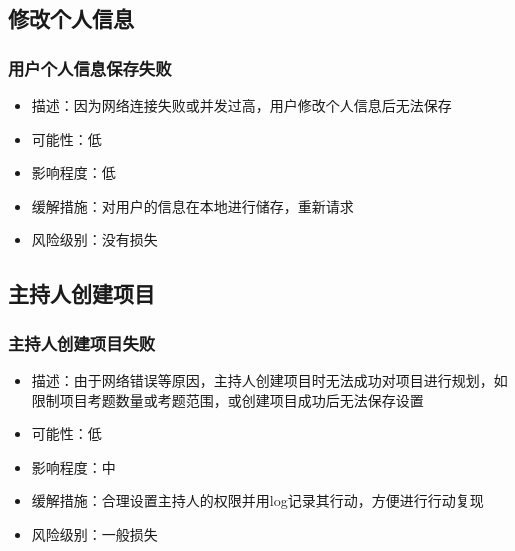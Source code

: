\documentclass[hyperref, a4paper]{ctexart}
\providecommand{\tightlist}{%
  \setlength{\itemsep}{0pt}\setlength{\parskip}{0pt}}
\begin{document}
\hypertarget{ux4feeux6539ux4e2aux4ebaux4fe1ux606f}{%
\subsection{修改个人信息}\label{ux4feeux6539ux4e2aux4ebaux4fe1ux606f}}

\hypertarget{ux7528ux6237ux4e2aux4ebaux4fe1ux606fux4fddux5b58ux5931ux8d25}{%
\subsubsection{用户个人信息保存失败}\label{ux7528ux6237ux4e2aux4ebaux4fe1ux606fux4fddux5b58ux5931ux8d25}}

\begin{itemize}
\tightlist
\item
  描述：因为网络连接失败或并发过高，用户修改个人信息后无法保存
\item
  可能性：低
\item
  影响程度：低
\item
  缓解措施：对用户的信息在本地进行储存，重新请求
\item
  风险级别：没有损失
\end{itemize}

\hypertarget{ux4e3bux6301ux4ebaux521bux5efaux9879ux76ee-1}{%
\subsection{主持人创建项目}\label{ux4e3bux6301ux4ebaux521bux5efaux9879ux76ee-1}}

\hypertarget{ux4e3bux6301ux4ebaux521bux5efaux9879ux76eeux5931ux8d25}{%
\subsubsection{主持人创建项目失败}\label{ux4e3bux6301ux4ebaux521bux5efaux9879ux76eeux5931ux8d25}}

\begin{itemize}
\tightlist
\item
  描述：由于网络错误等原因，主持人创建项目时无法成功对项目进行规划，如限制项目考题数量或考题范围，或创建项目成功后无法保存设置
\item
  可能性：低
\item
  影响程度：中
\item
  缓解措施：合理设置主持人的权限并用log记录其行动，方便进行行动复现
\item
  风险级别：一般损失
\end{itemize}
\end{document}
